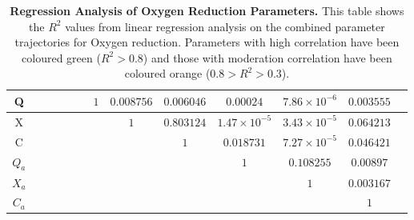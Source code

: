 \begin{table}[p]
{\begin{minipage}{24.4cm}
\begin{tabular}{|c|c|c|c|c|c|c|c|c|c|c|c|c|}
    \hline
    \cellcolor{dark-gray}Q & \cellcolor{light-gray} & \cellcolor{light-gray} & \cellcolor{light-gray} & \cellcolor{light-gray} & \cellcolor{light-gray} & \cellcolor{light-gray}$1$ & $0.008756$ & $0.006046$ & $0.00024$ & $7.86\times{}10^{-6}$ & $0.003555$ \\
    \hline
    \cellcolor{dark-gray}X & \cellcolor{light-gray} & \cellcolor{light-gray} & \cellcolor{light-gray} & \cellcolor{light-gray} & \cellcolor{light-gray} & \cellcolor{light-gray} & \cellcolor{light-gray}$1$ & \cellcolor{green}$0.803124$ & $1.47\times{}10^{-5}$ & $3.43\times{}10^{-5}$ & $0.064213$ \\
    \hline
    \cellcolor{dark-gray}C & \cellcolor{light-gray} & \cellcolor{light-gray} & \cellcolor{light-gray} & \cellcolor{light-gray} & \cellcolor{light-gray} & \cellcolor{light-gray} & \cellcolor{light-gray} & \cellcolor{light-gray}$1$ & $0.018731$ & $7.27\times{}10^{-5}$ & $0.046421$ \\
    \hline
    \cellcolor{dark-gray}$Q_a$ & \cellcolor{light-gray} & \cellcolor{light-gray} & \cellcolor{light-gray} & \cellcolor{light-gray} & \cellcolor{light-gray} & \cellcolor{light-gray} & \cellcolor{light-gray} & \cellcolor{light-gray} & \cellcolor{light-gray}$1$ & $0.108255$ & $0.00897$ \\
    \hline
    \cellcolor{dark-gray}$X_a$ & \cellcolor{light-gray} & \cellcolor{light-gray} & \cellcolor{light-gray} & \cellcolor{light-gray} & \cellcolor{light-gray} & \cellcolor{light-gray} & \cellcolor{light-gray} & \cellcolor{light-gray} & \cellcolor{light-gray} & \cellcolor{light-gray}$1$ & $0.003167$ \\
    \hline
    \cellcolor{dark-gray}$C_a$ & \cellcolor{light-gray} & \cellcolor{light-gray} & \cellcolor{light-gray} & \cellcolor{light-gray} & \cellcolor{light-gray} & \cellcolor{light-gray} & \cellcolor{light-gray} & \cellcolor{light-gray} & \cellcolor{light-gray} & \cellcolor{light-gray} & \cellcolor{light-gray}$1$ \\
    \hline
  \end{tabular}
  \caption[Regression Analysis of Oxygen Reduction Parameters]{{\bf Regression Analysis of Oxygen Reduction Parameters.} This table shows the $R^2$ values from linear regression analysis on the combined parameter trajectories for Oxygen reduction. Parameters with high correlation have been coloured green ($R^2>0.8$) and those with moderation correlation have been coloured orange ($0.8>R^2>0.3$).
  \label{tab:oxyregress}}
  \end{minipage}
  }
\end{table}
